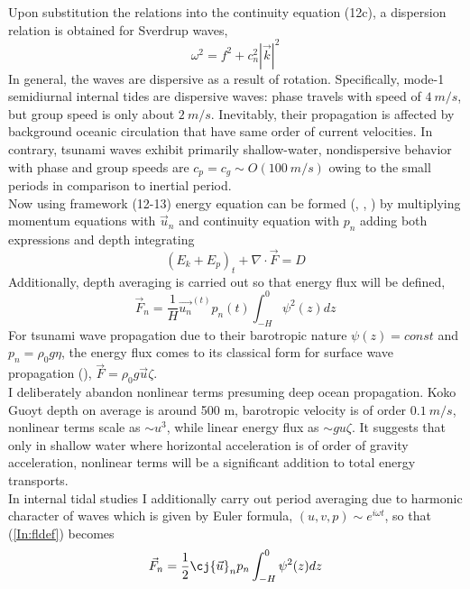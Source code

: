 Upon substitution the relations into the continuity equation (12c), a dispersion relation is obtained for Sverdrup waves,
\begin{equation}
\omega^2 = f^2 + c^2_n |\vec{k}|^2
\end{equation}
In general, the waves are dispersive as a result of rotation. Specifically, mode-1 semidiurnal internal tides are dispersive waves: phase travels with speed of $4~m/s$, but group speed is only about $2~m/s$. Inevitably, their propagation is affected by background oceanic circulation that have same order of current velocities. In contrary, tsunami waves exhibit primarily shallow-water, nondispersive behavior with phase and group speeds are $c_p = c_g \sim O(100~m/s)$ owing to the small periods in comparison to inertial period.\\
Now using framework (12-13) energy equation can be formed (\cite{nekrasov1990energy}, \cite{kowalik2013oceanography}, \cite{kelly2012cascade}) by multiplying momentum equations with $\vec{u}_n$ and continuity equation with $p_n$ adding both expressions and depth integrating 
\begin{equation}
(E_k + E_p)_t + \nabla \cdot \vec{F} = D \label{In:eneq}
\end{equation}
Additionally, depth averaging is carried out so that energy flux will be defined,
\begin{equation}
\vec{F}_n = \frac{1}{H} \vec{u_n}^(t) p_n(t) \int_{-H}^0 \psi^2(z) dz \label{In:fldef}
\end{equation}
For tsunami wave propagation due to their barotropic nature $\psi(z) = const$ and $p_n = \rho_0 g \eta$, the energy flux comes to its classical form for surface wave propagation  (\cite{henry2001representation}), $\vec{F} = \rho_0 g \vec{u} \zeta$.\\
I deliberately abandon nonlinear terms presuming deep ocean propagation. Koko Guoyt depth on average is around 500 m, barotropic velocity is of order $0.1~m/s$, nonlinear terms scale as $\sim u^3$, while linear energy flux as $\sim g u \zeta$. It suggests that only in shallow water where horizontal acceleration is of order of gravity acceleration, nonlinear terms will be a significant addition to total energy transports.\\
In internal tidal studies I additionally carry out period averaging due to harmonic character of waves which is given by Euler formula, $(u,v,p) \sim e^{i \omega t}$, so that (\ref{In:fldef}) becomes
\begin{align}
\vec{F}_n = \frac{1}{2} \cj{\vec{u}}_n p_n \int_{-H}^0 \psi^2(z) dz
\end{align}
